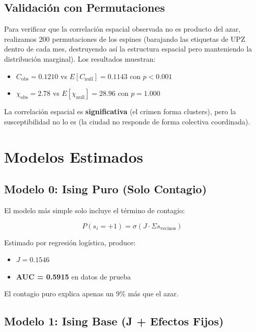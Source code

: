 \documentclass[12pt,a4paper]{article}
\begin{document}
\subsection{Validación con Permutaciones}

Para verificar que la correlación espacial observada no es producto del azar, realizamos 200 permutaciones de los espines (barajando las etiquetas de UPZ dentro de cada mes, destruyendo así la estructura espacial pero manteniendo la distribución marginal). Los resultados muestran:
\begin{itemize}
    \item $C_{\text{obs}} = 0.1210$ vs $E[C_{\text{null}}] = 0.1143$ con $p < 0.001$
    \item $\chi_{\text{obs}} = 2.78$ vs $E[\chi_{\text{null}}] = 28.96$ con $p = 1.000$
\end{itemize}

La correlación espacial es \textbf{significativa} (el crimen forma clusters), pero la susceptibilidad no lo es (la ciudad no responde de forma colectiva coordinada).

\section{Modelos Estimados}

\subsection{Modelo 0: Ising Puro (Solo Contagio)}

El modelo más simple solo incluye el término de contagio:

\begin{equation}
P(s_i=+1) = \sigma(J \cdot \Sigma s_{\text{vecinos}})
\end{equation}

Estimado por regresión logística, produce:
\begin{itemize}
    \item $J = 0.1546$
    \item \textbf{AUC = 0.5915} en datos de prueba
\end{itemize}

El contagio puro explica apenas un 9\% más que el azar.

\subsection{Modelo 1: Ising Base (J + Efectos Fijos)}
\end{document}
